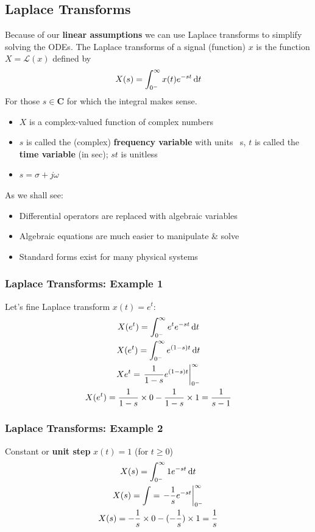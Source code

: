 \documentclass[class=report, crop=false, 12pt,a4paper, tikz, border=4mm]{standalone}
\newcommand{\Lagr}{\mathcal{L}}
\begin{document}
\subsection{Laplace Transforms}
Because of our \textbf{linear assumptions} we can use Laplace transforms to simplify solving the ODEs. The Laplace transforms of a signal (function) $x$ is the function $X = \Lagr (x)$ defined by
\begin{equation}
  X(s) = \int_{0^-}^\infty x(t) e^{-st} \dif t
\end{equation}
For those $s \in \textbf{C}$ for which the integral makes sense.
\begin{itemize}
  \item $X$ is a complex-valued function of complex numbers
  \item $s$ is called the (complex) \textbf{frequency variable} with units \si{\per\second}, $t$ is called the \textbf{time variable} (in sec); $st$ is unitless
  \item $s = \sigma + j \omega$
\end{itemize}
As we shall see:
\begin{itemize}
  \item Differential operators are replaced with algebraic variables
  \item Algebraic equations are much easier to manipulate \& solve
  \item Standard forms exist for many physical systems
\end{itemize}
\subsubsection{Laplace Transforms: Example 1}
Let's fine Laplace transform $x(t) = e^t$:
\begin{gather}
  X(e^t) = \int_{0^-}^\infty e^t e^{-st} \dif t\\
  X(e^t) = \int_{0^-}^\infty e^{(1-s)t} \dif t\\
  X{e^t} = \left. \frac{1}{1-s}e^{(1-s)t}\right|_{0^-}^\infty \\
  X(e^t) = \frac{1}{1-s} \times 0 - \frac{1}{1-s} \times 1 = \frac{1}{s-1}
\end{gather}
\subsubsection{Laplace Transforms: Example 2}
Constant or \textbf{unit step} $x(t) =1$ (for $t \geq 0$)
\begin{gather}
  X(s) = \int_{0^-}^{\infty} 1 e^{-st}\dif t\\
  X(s) = \int = \left. -\frac{1}{s} e^{-st} \right|_{0^-}^\infty\\
  X(s) = - \frac{1}{s} \times 0 - (- \frac{1}{s}) \times 1 = \frac{1}{s}
\end{gather}
\end{document}
